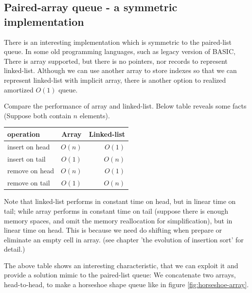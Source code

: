 \documentclass{article}
\begin{document}
\subsection{Paired-array queue - a symmetric implementation}

There is an interesting implementation which is symmetric to the paired-list
queue. In some old programming languages, such as legacy version of BASIC,
There is array supported, but there is no pointers, nor records to represent
linked-list. Although we can use another array to store indexes so that we
can represent linked-list with implicit array, there is another option to
realized amortized $O(1)$ queue.

Compare the performance of array and linked-list. Below table reveals some
facts (Suppose both contain $n$ elements).

\begin{tabular}{l | c | r}
  \hline
  operation & Array & Linked-list \\
  \hline
  insert on head & $O(n)$ & $O(1)$ \\
  insert on tail & $O(1)$ & $O(n)$ \\
  remove on head & $O(n)$ & $O(1)$ \\
  remove on tail & $O(1)$ & $O(n)$ \\
  \hline
\end{tabular}

Note that linked-list performs in constant time on head, but in linear time on tail;
while array performs in constant time on tail (suppose there is enough memory spaces, and
omit the memory reallocation for simplification), but in linear time on head.
This is because we need do shifting when prepare or eliminate an empty cell in array.
(see chapter 'the evolution of insertion sort' for detail.)

The above table shows an interesting characteristic, that we can exploit it and provide
a solution mimic to the paired-list queue: We concatenate two arrays, head-to-head, to
make a horseshoe shape queue like in figure \ref{fig:horseshoe-array}.
\end{document}
